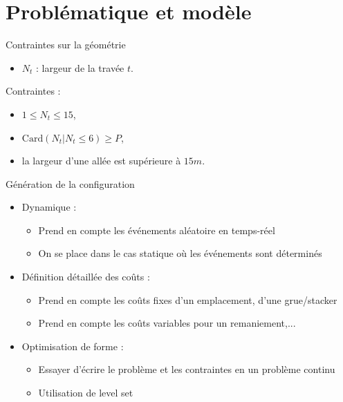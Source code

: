 \section{Problématique et modèle}

\begin{frame}{Contraintes sur la géométrie}
  \vfill 
  \begin{itemize}
  \item $N_t$ : largeur de la travée $t$.
  \end{itemize} 
  \vfill
  Contraintes : 
  \vfill
  \begin{itemize}
  \item $1 \leq N_t \leq 15$,
    \vfill
  \item $\mathrm{Card}(N_t\vert N_t \leq  6) \geq  P$,
    \vfill
  \item la largeur d'une allée est supérieure à $15m$.
    \vfill
  \end{itemize}   
  \vfill
\end{frame}

\begin{frame}{Génération de la configuration}
  \begin{itemize}
  \item Dynamique \cite{rekik2015}:
    \begin{itemize}
    \item Prend en compte les événements aléatoire en temps-réel
    \item On se place dans le cas statique où les événements sont déterminés
    \end{itemize}
    \vfill
  \item Définition détaillée des coûts \cite{kim98}:
    \begin{itemize}
    \item Prend en compte les coûts fixes d'un emplacement, d'une grue/stacker
    \item Prend en compte les coûts variables pour un remaniement,...
    \end{itemize}
    \vfill
  \item Optimisation de forme \cite{allaire2006}:
    \begin{itemize}
    \item Essayer d'écrire le problème et les contraintes en un problème continu
    \item Utilisation de level set
    \end{itemize}
  \end{itemize}
\end{frame}

